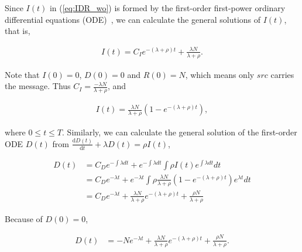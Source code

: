 Since $I(t)$ in (\ref{eq:IDR_wo}) is formed by the first-order first-power
ordinary differential equations (ODE)~\cite{CC2007PerfAnaly},
we can calculate the general solutions of $I(t)$, that is,
\begin{small}
\begin{equation}
\nonumber
\begin{aligned}
I(t) = C_{I} e^{-(\lambda + \rho)t} + \frac{ \lambda N }{ \lambda + \rho }.
\end{aligned}
\end{equation}
\end{small}
Note that $I(0)=0$, $D(0)=0$ and $R(0)=N$,
which means only $src$ carries the message.
Thus $C_{I} = \frac{ -\lambda N }{ \lambda + \rho }$, and
\begin{small}
\begin{equation}
\nonumber
\begin{aligned}
I(t) = \frac{ \lambda N }{ \lambda + \rho }(1- e^{-(\lambda + \rho)t}),
\end{aligned}
\end{equation}
\end{small}
where $0 \le t \le T$.
Similarly, we can calculate the general solution of the first-order ODE $D(t)$
from $\frac{\mathrm{d} D(t)}{\mathrm{d} t} + \lambda D(t) = \rho I(t)$,
\begin{small}
\begin{equation}
\label{eq:D_formula}
\begin{aligned}
D(t) &= C_{D} e^{-\int \lambda dt} + e^{-\int \lambda dt} \int \rho I(t) e^{\int \lambda dt} dt \\
&= C_{D} e^{- \lambda t} +
e^{- \lambda t} \int \rho \frac{ \lambda N }{ \lambda + \rho } (1 - e^{-(\lambda + \rho)t}) e^{ \lambda t} dt \\
&= C_{D} e^{- \lambda t} + \frac{ \lambda N }{ \lambda + \rho } e^{-(\lambda + \rho)t} + \frac{ \rho N }{ \lambda + \rho }
\end{aligned}
\end{equation}
\end{small}
Because of $D(0)=0$,
\begin{small}
\begin{equation}
\nonumber
\begin{aligned}
D(t) &= -N e^{- \lambda t} + \frac{ \lambda N }{ \lambda + \rho } e^{-(\lambda + \rho)t} + \frac{ \rho N }{ \lambda + \rho }.
\end{aligned}
\end{equation}
\end{small}
